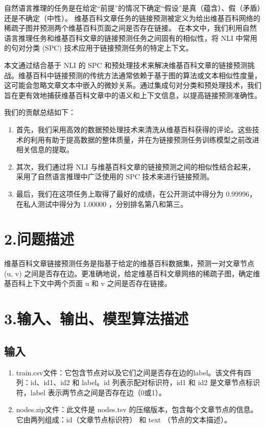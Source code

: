 \documentclass[
]{article}
\begin{document}
自然语言推理的任务是在给定“前提”的情况下确定“假设”是真（蕴含）、假（矛盾）还是不确定（中性）。
维基百科文章任务的链接预测被定义为给出维基百科网络的稀疏子图并预测两个维基百科页面之间是否存在链接。
在本文中，我们利用自然语言推理任务和维基百科文章的链接预测任务之间固有的相似性，将
NLI 中常用的句对分类 (SPC) 技术应用于链接预测任务的特定上下文。

本文通过结合基于 NLI 的 SPC
和预处理技术来解决维基百科文章的链接预测挑战。维基百科中链接预测的传统方法通常依赖于基于图的算法或文本相似性度量，这可能会忽略文章文本中嵌入的微妙关系。通过集成句对分类和预处理技术，我们旨在更有效地捕获维基百科文章中的语义和上下文信息，以提高链接预测准确性。

我们的贡献总结如下：

\begin{enumerate}
  \def\labelenumi{\arabic{enumi}.}
  \item
        首先，我们采用高效的数据预处理技术来清洗从维基百科获得的评论。这些技术的利用有助于提高数据的整体质量，并在为链接预测任务训练模型之前改进相关信息的提取。
  \item
        其次，我们通过将 NLI
        与维基百科文章的链接预测之间的相似性结合起来，采用了自然语言推理中广泛使用的
        SPC 技术来进行链接预测。
  \item
        最后，我们在这项任务上取得了最好的成绩，在公开测试中得分为
        0.99996，在私人测试中得分为 1.00000 ，分别排名第八和第三。
\end{enumerate}

\section{2.问题描述}\label{2ux95eeux9898ux63cfux8ff0}

维基百科文章链接预测任务是指基于给定的维基百科数据集，预测一对文章节点
(u, v)
之间是否存在边。更准确地说，给定维基百科文章网络的稀疏子图，确定维基百科上下文中两个页面
u 和 v 之间是否存在链接。

\section{3.输入、输出、模型算法描述}\label{3ux8f93ux5165ux8f93ux51faux6a21ux578bux7b97ux6cd5ux63cfux8ff0}

\subsection{输入}\label{ux8f93ux5165}

\begin{enumerate}
  \def\labelenumi{\arabic{enumi}.}
  \item
        train.csv文件：它包含节点对以及它们之间是否存在边的label。该文件有四列：id、id1、id2
        和 label。id 列表示配对标识符，id1 和 id2 是文章节点标识符，label
        表示两节点之间是否存在边（0或1）。
  \item
        nodes.zip文件：此文件是 nodes.tsv
        的压缩版本，包含每个文章节点的信息。它由两列组成：id（文章节点标识符）
        和 text （节点的文本描述）。
\end{enumerate}
\end{document}

